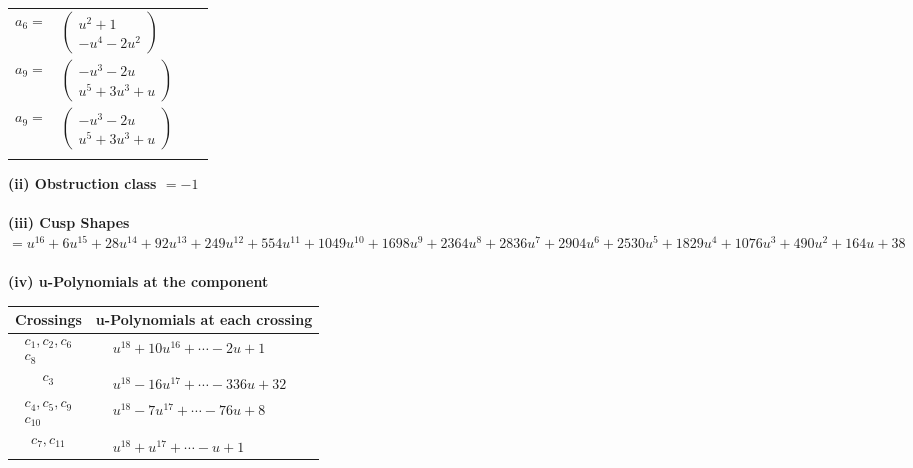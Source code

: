 \documentclass[1p]{elsarticle_modified}
\theoremstyle{definition}
\begin{document}
\begin{tabular}{m{7pt} m{180pt} m{7pt} m{180pt} }
\flushright $a_{6}=$&$\begin{pmatrix}u^2+1\\- u^4-2 u^2\end{pmatrix}$ \\
\flushright $a_{9}=$&$\begin{pmatrix}- u^3-2 u\\u^5+3 u^3+u\end{pmatrix}$\\ \flushright $a_{9}=$&$\begin{pmatrix}- u^3-2 u\\u^5+3 u^3+u\end{pmatrix}$\\&\end{tabular}
\flushleft \textbf{(ii) Obstruction class $= -1$}\\~\\
\flushleft \textbf{(iii) Cusp Shapes $= u^{16}+6 u^{15}+28 u^{14}+92 u^{13}+249 u^{12}+554 u^{11}+1049 u^{10}+1698 u^9+2364 u^8+2836 u^7+2904 u^6+2530 u^5+1829 u^4+1076 u^3+490 u^2+164 u+38$}\\~\\
\newpage\renewcommand{\arraystretch}{1}
\flushleft \textbf{(iv) u-Polynomials at the component}\newline \\
\begin{tabular}{m{50pt}|m{274pt}}
Crossings & \hspace{64pt}u-Polynomials at each crossing \\
\hline $$\begin{aligned}c_{1},c_{2},c_{6}\\c_{8}\end{aligned}$$&$\begin{aligned}
&u^{18}+10 u^{16}+\cdots-2 u+1
\end{aligned}$\\
\hline $$\begin{aligned}c_{3}\end{aligned}$$&$\begin{aligned}
&u^{18}-16 u^{17}+\cdots-336 u+32
\end{aligned}$\\
\hline $$\begin{aligned}c_{4},c_{5},c_{9}\\c_{10}\end{aligned}$$&$\begin{aligned}
&u^{18}-7 u^{17}+\cdots-76 u+8
\end{aligned}$\\
\hline $$\begin{aligned}c_{7},c_{11}\end{aligned}$$&$\begin{aligned}
&u^{18}+u^{17}+\cdots- u+1
\end{aligned}$\\
\hline
\end{tabular}\\~\\
\end{document}

